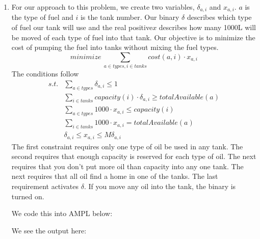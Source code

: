 \documentclass[11pt]{article}
\begin{document}
\begin{enumerate}
\item For our approach to this problem, we create two variables, $\delta_{a,i}$ and $x_{a,i}$.  $a$ is the type of fuel and $i$ is the tank number.  Our binary $\delta$ describes which type of fuel our tank will use and the real positive$x$ describes how many 1000L will be moved of each type of fuel into that tank.    Our objective is to minimize the cost of pumping the fuel into tanks without mixing the fuel types.  
\[
minimize\ \sum_{a \in types, i \in tanks} cost(a,i)\cdot x_{a,i}
\]
The conditions follow
\begin{equation}
\begin{array}{cl}
s.t. & \sum_{a \in types} \delta_{a,i} \leq 1\\
&\sum_{i \in tanks} capacity(i)\cdot \delta_{a,i}\geq totalAvailable(a)\\
&\sum_{a \in types} 1000\cdot x_{a,i} \leq capacity(i)\\
&\sum_{i \in tanks} 1000\cdot x_{a,i} = totalAvailable(a)\\
& \delta_{a,i} \leq x_{a,i} \leq M\delta_{a,i}
\end{array}
\end{equation}
The first constraint requires only one type of oil be used in any tank.  The second requires that enough capacity is reserved for each type of oil.  The next requires that you don't put more oil than capacity into any one tank.  The next requires that all oil find a home in one of the tanks.  The last requirement activates $\delta$.  If you move any oil into the tank, the binary is turned on.

We code this into AMPL below:

{\tiny {}}

We see the output here:



\end{enumerate}
\end{document}
